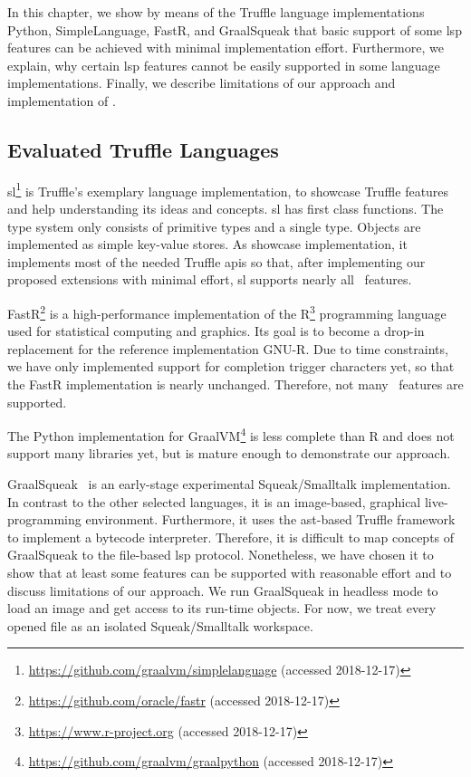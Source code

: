 \documentclass[sigplan,10pt,review,anonymous]{acmart}
\begin{document}
In this chapter, we show by means of the Truffle language implementations
Python, SimpleLanguage, FastR, and GraalSqueak that basic support of some
\ac{lsp} features can be achieved with minimal implementation
effort. Furthermore, we explain, why certain \ac{lsp} features cannot be easily
supported in some language implementations. Finally, we describe limitations of
our approach and implementation of \graallsp.

\subsection{Evaluated Truffle Languages}
\label{sec:xp:ComparisonOfLangImpls}

\acf{sl}\footnote{\url{https://github.com/graalvm/simplelanguage} (accessed
  2018-12-17)} is Truffle's exemplary language implementation, to showcase
Truffle features and help understanding its ideas and concepts. \ac{sl} has
first class functions. The type system only consists of primitive types and a
single  type. Objects are implemented as simple key-value
stores. As showcase implementation, it implements most of the needed Truffle
\acp{api} so that, after implementing our proposed extensions with minimal
effort, \ac{sl} supports nearly all \graallsp~features.

FastR\footnote{\url{https://github.com/oracle/fastr} (accessed 2018-12-17)} is a
high-performance implementation of the
R\footnote{\url{https://www.r-project.org} (accessed 2018-12-17)} programming
language used for statistical computing and graphics. Its goal is to become a
drop-in replacement for the reference implementation GNU-R. Due to time
constraints, we have only implemented support for completion trigger characters
yet, so that the FastR implementation is nearly unchanged. Therefore, not many
\graallsp~features are supported.

The Python implementation for
GraalVM\footnote{\url{https://github.com/graalvm/graalpython} (accessed
  2018-12-17)} is less complete than R and does not support many libraries yet,
but is mature enough to demonstrate our approach.

GraalSqueak~\cite{niephaus2018graalsqueak} is an early-stage experimental
Squeak/Smalltalk \cite{ingalls1997back} implementation. In contrast to the other
selected languages, it is an image-based, graphical live-programming
environment. Furthermore, it uses the \ac{ast}-based Truffle framework to
implement a bytecode interpreter. Therefore, it is difficult to map concepts of
GraalSqueak to the file-based \ac{lsp} protocol. Nonetheless, we have chosen it
to show that at least some features can be supported with reasonable effort and
to discuss limitations of our approach. We run GraalSqueak in headless mode to
load an image and get access to its run-time objects. For now, we treat every
opened  file as an isolated Squeak/Smalltalk workspace.
\end{document}
